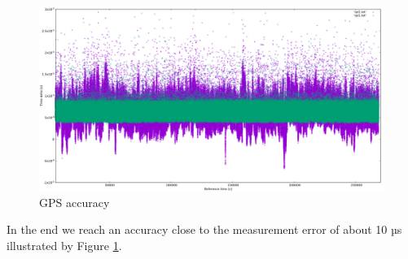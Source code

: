\begin{figure}[tb]
	\centering
	\includegraphics[width=1.0\textwidth]{figures/plot_gps3.png}
	\caption{GPS accuracy}
	\label{fig:plot_gps3}
\end{figure}

In the end we reach an accuracy close to the measurement error of about 10 µs illustrated by Figure \ref{fig:plot_gps3}.

